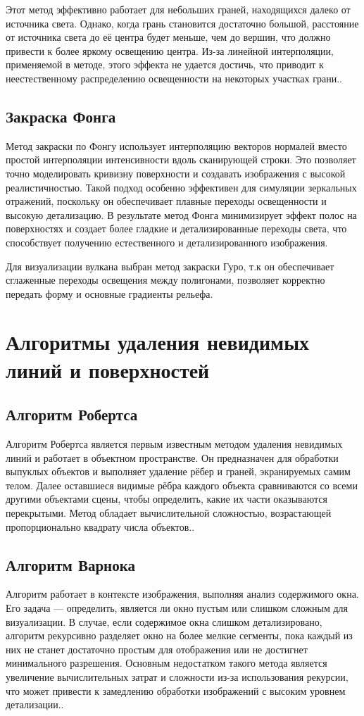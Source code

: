 Этот метод эффективно работает для небольших граней, находящихся далеко от источника света. Однако, когда грань становится достаточно большой, расстояние от источника света до её центра будет меньше, чем до вершин, что должно привести к более яркому освещению центра. Из-за линейной интерполяции, применяемой в методе, этого эффекта не удается достичь, что приводит к неестественному распределению освещенности на некоторых участках грани.\cite{lit2}.

\subsection{Закраска Фонга}
Метод закраски по Фонгу использует интерполяцию векторов нормалей вместо простой интерполяции интенсивности вдоль сканирующей строки. Это позволяет точно моделировать кривизну поверхности и создавать изображения с высокой реалистичностью. Такой подход особенно эффективен для симуляции зеркальных отражений, поскольку он обеспечивает плавные переходы освещенности и высокую детализацию. В результате метод Фонга минимизирует эффект полос на поверхностях и создает более гладкие и детализированные переходы света, что способствует получению естественного и детализированного изображения.

Для визуализации вулкана выбран метод закраски Гуро, т.к он обеспечивает сглаженные переходы освещения между полигонами, позволяет корректно передать форму и основные градиенты рельефа.
 
\section{Алгоритмы удаления невидимых линий и поверхностей}

\subsection{Алгоритм Робертса} 

Алгоритм Робертса является первым известным методом удаления невидимых линий и работает в объектном пространстве. Он предназначен для обработки выпуклых объектов и выполняет удаление рёбер и граней, экранируемых самим телом. Далее оставшиеся видимые рёбра каждого объекта сравниваются со всеми другими объектами сцены, чтобы определить, какие их части оказываются перекрытыми. Метод обладает вычислительной сложностью, возрастающей пропорционально квадрату числа объектов.\cite{lit2}.

\subsection{Алгоритм Варнока}
Алгоритм работает в контексте изображения, выполняя анализ содержимого окна. Его задача --- определить, является ли окно пустым или слишком сложным для визуализации. В случае, если содержимое окна слишком детализировано, алгоритм рекурсивно разделяет окно на более мелкие сегменты, пока каждый из них не станет достаточно простым для отображения или не достигнет минимального разрешения. Основным недостатком такого метода является увеличение вычислительных затрат и сложности из-за использования рекурсии, что может привести к замедлению обработки изображений с высоким уровнем детализации.\cite{lit2}.

